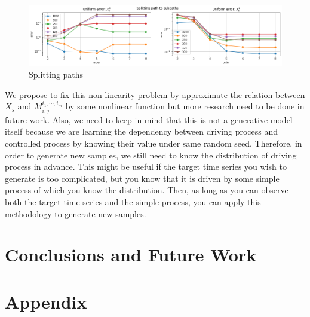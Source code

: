 \documentclass[12pt]{report}
\theoremstyle{definition}
\theoremstyle{remark}
\begin{document}
\begin{figure}[H]
  \centering
  \includegraphics[width=\textwidth]{figs/res7.png}
  \caption{Splitting paths}
\end{figure}
We propose to fix this non-linearity problem by approximate the relation between $X_{s}$ and $M^{i_{1},\cdots,i_{m}}_{i,j}$ by some nonlinear function but more research need to be done in future work. Also, we need to keep in mind that this is not a generative model itself because we are learning the dependency between driving process and controlled process by knowing their value under same random seed. Therefore, in order to generate new samples, we still need to know the distribution of driving process in advance. This might be useful if the target time series you wish to generate is too complicated, but you know that it is driven by some simple process of which you know the distribution. Then, as long as you can observe both the target time series and the simple process, you can apply this methodology to generate new samples.

\chapter{Conclusions and Future Work}


\chapter{Appendix}

\nocite{*}


\end{document}
